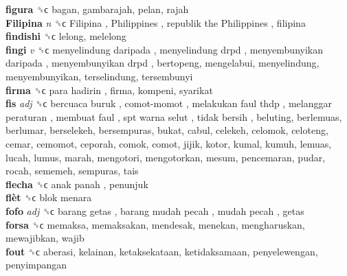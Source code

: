 \textbf{figura} ␝ϲ  bagan, gambarajah, pelan, rajah  \\
\textbf{Filipina} \emph{n}  ␝ϲ   Filipina ,  Philippines ,  republik the Philippines , filipina  \\
\textbf{findishi} ␝ϲ  lelong, melelong  \\
\textbf{fingi} \emph{v}  ␝ϲ   menyelindung daripada ,  menyelindung drpd ,  menyembunyikan daripada ,  menyembunyikan drpd , bertopeng, mengelabui, menyelindung, menyembunyikan, terselindung, tersembunyi  \\
\textbf{firma} ␝ϲ   para hadirin , firma, kompeni, syarikat  \\
\textbf{fis} \emph{adj}  ␝ϲ   bercuaca buruk ,  comot-momot ,  melakukan faul thdp ,  melanggar peraturan ,  membuat faul ,  spt warna selut ,  tidak bersih , beluting, berlemuas, berlumar, berselekeh, bersempuras, bukat, cabul, celekeh, celomok, celoteng, cemar, cemomot, ceporah, comok, comot, jijik, kotor, kumal, kumuh, lemuas, lucah, lumus, marah, mengotori, mengotorkan, mesum, pencemaran, pudar, rocah, sememeh, sempuras, tais  \\
\textbf{flecha} ␝ϲ   anak panah , penunjuk  \\
\textbf{flèt} ␝ϲ   blok menara   \\
\textbf{fofo} \emph{adj}  ␝ϲ   barang getas ,  barang mudah pecah ,  mudah pecah , getas  \\
\textbf{forsa} ␝ϲ  memaksa, memaksakan, mendesak, menekan, mengharuskan, mewajibkan, wajib  \\
\textbf{fout} ␝ϲ  aberasi, kelainan, ketaksekataan, ketidaksamaan, penyelewengan, penyimpangan  \\
